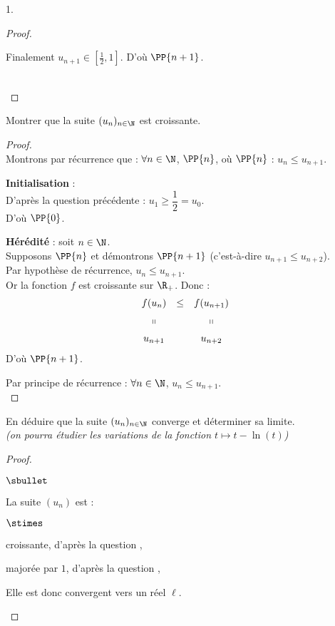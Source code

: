 \begin{noliste}{1.}
\begin{proof}
\begin{noliste}{\fitem}
 \newpage
 
  Finalement $u_{n+1}\in \left[\frac{1}{2},1\right]$. D'où $\PP{n+1}$.
 \end{noliste}
 ~\\[-1cm]
\end{proof}

\item Montrer que la suite $(u_n)_{n\in \N}$ est croissante.

  \begin{proof}~\\
    Montrons par récurrence que : $\forall n\in\N$, $\PP{n}$, \quad où
    \quad $\PP{n}$ : $u_n\leq u_{n+1}$.
    \begin{noliste}{\fitem}
    \item {\bf Initialisation} : \\
      D'après la question 
      précédente : $u_1\geq \dfrac{1}{2} =u_0$.\\
      D'où $\PP{0}$.
      
    \item {\bf Hérédité} : soit $n\in\N$.\\
      Supposons $\PP{n}$ et démontrons $\PP{n+1}$ (c'est-à-dire
      $u_{n+1} \leq u_{n+2}$).\\
      Par hypothèse de récurrence, $u_n \leq u_{n+1}$.\\
      Or la fonction $f$ est croissante sur $\R_+$. Donc :
      \[
      \begin{array}{ccc}
        f(u_n) & \leq & f(u_{n+1})
        \\[.2cm]
        \shortparallel & & \shortparallel
        \\[.2cm]
        u_{n+1} & & u_{n+2}
      \end{array}
      \]
      D'où $\PP{n+1}$.
    \end{noliste}
    Par principe de récurrence : $\forall n\in\N$, $u_n\leq u_{n+1}$.%
    ~\\[-1cm]
  \end{proof}

\item En déduire que la suite $(u_n)_{n\in \N}$ converge et déterminer
  sa limite.\\
  {\it (on pourra étudier les variations de la fonction $t\mapsto
    t-\ln(t)$)}

\begin{proof}~
 \begin{noliste}{$\sbullet$}
  \item La suite $(u_n)$ est :
  \begin{noliste}{$\stimes$}
    \item croissante, d'après la question ,
    \item majorée par $1$, d'après la question ,
  \end{noliste}
  Elle est donc convergent vers un réel $\ell$.
  

\end{noliste}
\end{proof}
\end{noliste}
